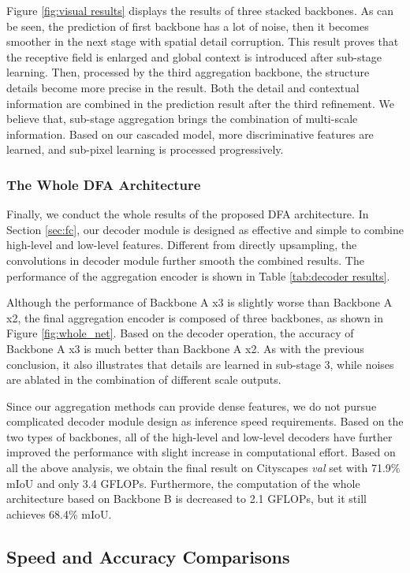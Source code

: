 \documentclass[10pt,twocolumn,letterpaper]{article}
\begin{document}
Figure \ref{fig:visual results} displays the results of three stacked backbones. As can be seen, the prediction of first backbone has a lot of noise, then it becomes smoother in the next stage with spatial detail corruption. This result proves that the receptive field is enlarged and global context is introduced after sub-stage learning. Then, processed by the third aggregation backbone, the structure details become more precise in the result. Both the detail and contextual information are combined in the prediction result after the third refinement. We believe that, sub-stage aggregation brings the combination of multi-scale information. Based on our cascaded model, more discriminative features are learned, and sub-pixel learning is processed progressively. 



\subsubsection{The Whole DFA Architecture}
Finally, we conduct the whole results of the proposed DFA architecture. In Section \ref{sec:fc}, our decoder module is designed as effective and simple to combine high-level and low-level features. Different from directly upsampling, the convolutions in decoder module further smooth the combined results. The performance of the aggregation encoder is shown in Table \ref{tab:decoder results}. 

Although the performance of Backbone A x3 is slightly worse than Backbone A x2, the final aggregation encoder is composed of three backbones, as shown in Figure \ref{fig:whole_net}. Based on the decoder operation, the accuracy of Backbone A x3 is much better than Backbone A x2. As with the previous conclusion, it also illustrates that details are learned in sub-stage 3, while noises are ablated in the combination of different scale outputs. 

Since our aggregation methods can provide dense features, we do not pursue complicated decoder module design as inference speed requirements. Based on the two types of backbones, all of the high-level and low-level decoders have further improved the performance with slight increase in computational effort. 
Based on all the above analysis, we obtain the final result on Cityscapes \textit{val} set with 71.9\% mIoU and only 3.4 GFLOPs. Furthermore, the computation of the whole architecture based on Backbone B is decreased to 2.1 GFLOPs, but it still achieves 68.4\% mIoU.

\subsection{Speed and Accuracy Comparisons}
\end{document}

